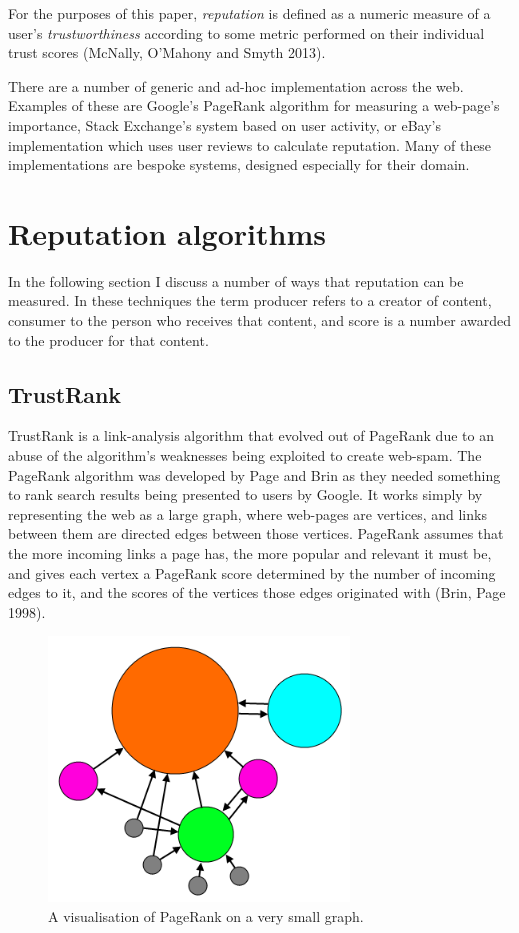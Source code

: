 \documentclass[]{final_report}
\begin{document}
For the purposes of this paper, \textsl{reputation} is defined as a numeric measure of a user's \textsl{trustworthiness} according to some metric performed on their individual trust scores (McNally, O'Mahony and Smyth 2013).

There are a number of generic and ad-hoc implementation across the web. Examples of these are Google's PageRank algorithm for measuring a web-page's importance, Stack Exchange's system based on user activity, or eBay's implementation which uses user reviews to calculate reputation. Many of these implementations are bespoke systems, designed especially for their domain.


\section{Reputation algorithms}
In the following section I discuss a number of ways that reputation can be measured. In these techniques the term producer refers to a creator of content, consumer to the person who receives that content, and score is a number awarded to the producer for that content.


\subsection{TrustRank}

TrustRank is a link-analysis algorithm that evolved out of PageRank due to an abuse of the algorithm's weaknesses being exploited to create web-spam. The PageRank algorithm was developed by Page and Brin as they needed something to rank search results being presented to users by Google. It works simply by representing the web as a large graph, where web-pages are vertices, and links between them are directed edges between those vertices. PageRank assumes that the more incoming links a page has, the more popular and relevant it must be, and gives each vertex a PageRank score determined by the number of incoming edges to it, and the scores of the vertices those edges originated with (Brin, Page 1998).

\begin{figure}[ht!]
\centering
\includegraphics[width=80mm]{pagerank.png}
\caption{A visualisation of PageRank on a very small graph.}
\end{figure}
\end{document}
